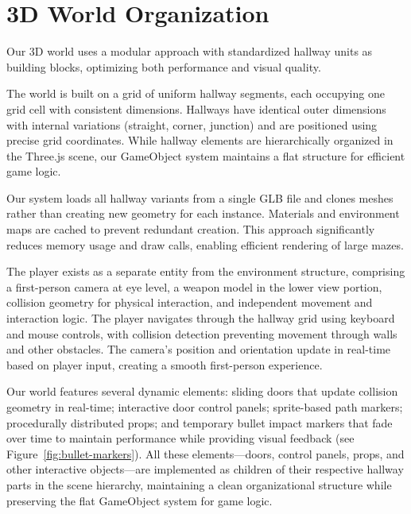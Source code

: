 \documentclass{article}
\begin{document}
\section{3D World Organization}
Our 3D world uses a modular approach with standardized hallway units as building blocks, optimizing both performance and visual quality.

The world is built on a grid of uniform hallway segments, each occupying one grid cell with consistent dimensions. Hallways have identical outer dimensions with internal variations (straight, corner, junction) and are positioned using precise grid coordinates. While hallway elements are hierarchically organized in the Three.js scene, our GameObject system maintains a flat structure for efficient game logic.

Our system loads all hallway variants from a single GLB file and clones meshes rather than creating new geometry for each instance. Materials and environment maps are cached to prevent redundant creation. This approach significantly reduces memory usage and draw calls, enabling efficient rendering of large mazes.

The player exists as a separate entity from the environment structure, comprising a first-person camera at eye level, a weapon model in the lower view portion, collision geometry for physical interaction, and independent movement and interaction logic. The player navigates through the hallway grid using keyboard and mouse controls, with collision detection preventing movement through walls and other obstacles. The camera's position and orientation update in real-time based on player input, creating a smooth first-person experience.

Our world features several dynamic elements: sliding doors that update collision geometry in real-time; interactive door control panels; sprite-based path markers; procedurally distributed props; and temporary bullet impact markers that fade over time to maintain performance while providing visual feedback (see Figure~\ref{fig:bullet-markers}). All these elements—doors, control panels, props, and other interactive objects—are implemented as children of their respective hallway parts in the scene hierarchy, maintaining a clean organizational structure while preserving the flat GameObject system for game logic.
\end{document}
